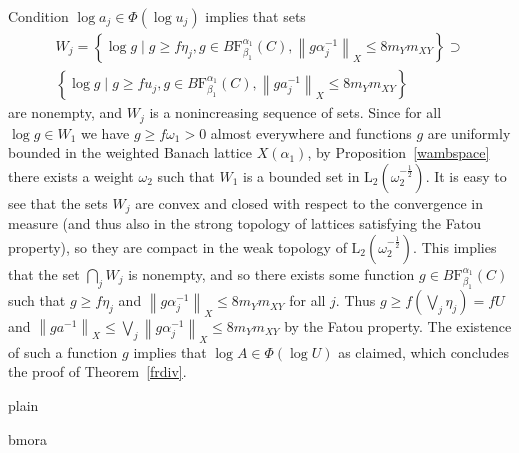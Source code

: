 \documentclass[12pt]{amsart}
\newcommand {\frclass} [2] {\ensuremath{\mathrm F^{#1}_{#2}}}
\newcommand {\lclass} [2] {\ensuremath{\mathrm L_{#1} \left( #2 \right) }}
\newcommand {\fbab} [3] {\ensuremath {B\frclass {#1} {#2} \left(#3\right)}}
\begin{document}
Condition $\log a_j \in \Phi (\log u_j)$ implies that sets
\begin {multline*}
W_j = \left\{ \log g \mid g \geqslant f \eta_j, g \in \fbab {\alpha_1} {\beta_1} {C},
\left\|g \alpha_j^{-1}\right\|_X \leqslant 8 m_{Y} m_{X Y} \right\} \supset
\\
\left\{ \log g \mid g \geqslant f u_j, g \in \fbab {\alpha_1} {\beta_1} {C},
\left\|g a_j^{-1}\right\|_X \leqslant 8 m_{Y} m_{X Y} \right\}
\end {multline*}
are nonempty,
and $W_j$ is a nonincreasing sequence of sets.
Since for all $\log g \in W_1$ we have $g \geqslant f \omega_1 > 0$ almost everywhere and functions
$g$ are uniformly bounded in the weighted Banach lattice $X (\alpha_1)$,
by Proposition~\ref {wambspace} there exists a weight $\omega_2$ such that 
$W_1$ is a bounded set in $\lclass {2} {\omega_2^{-\frac 1 2}}$.  It is easy to see that the sets $W_j$ are
convex and closed with respect to the convergence in measure
(and thus also in the strong topology of lattices satisfying the Fatou property),
so they are compact
in the weak topology of $\lclass {2} {\omega_2^{-\frac 1 2}}$.  This implies that
the set $\bigcap_j W_j$ is nonempty, and so there exists some function $g \in \fbab {\alpha_1} {\beta_1} {C}$
such that $g \geqslant f \eta_j$ and $\left\|g \alpha_j^{-1}\right\|_X \leqslant 8 m_{Y} m_{X Y}$ for all $j$.
Thus $g \geqslant f \left(\bigvee_j \eta_j\right) = f U$ and
$\left\|g a^{-1}\right\|_X \leqslant \bigvee_j \left\|g \alpha_j^{-1}\right\|_X \leqslant 8 m_{Y} m_{X Y}$
by the Fatou property.  The existence of such a function $g$ implies that $\log A \in \Phi (\log U)$ as claimed,
which concludes the proof of Theorem~\ref {frdiv}.



\normalsize
\baselineskip=17pt

 {plain}

 {bmora}
\end{document}
